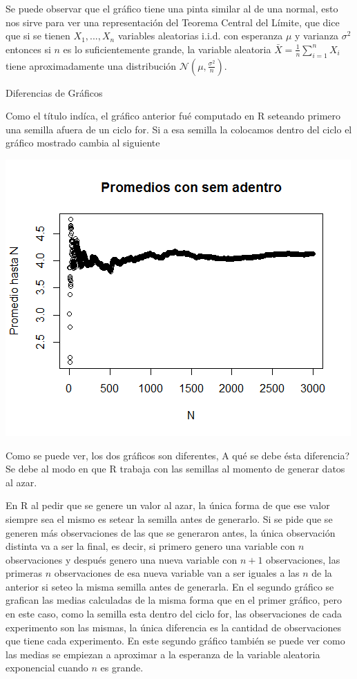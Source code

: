 \documentclass{article}
\begin{document}
	Se puede observar que el gr\'afico tiene una pinta similar al de una normal, esto nos sirve para ver una representaci\'on del Teorema Central del L\'imite, que dice que si se tienen $X_1,...,X_n$ variables aleatorias i.i.d. con esperanza $\mu$ y varianza $\sigma^2$ entonces si $n$ es lo suficientemente grande, la variable aleatoria $\bar{X} = \frac{1}{n}\sum_{i=1}^{n} X_i$ tiene aproximadamente una distribuci\'on $\mathcal{N}(\mu, \frac{\sigma^2}{n})$.
	\linebreak
	\linebreak
	\begin{flushleft}
		{\large Diferencias de Gr\'aficos}
		\linebreak
	\end{flushleft}
	Como el t\'itulo ind\'ica, el gr\'afico anterior fu\'e computado en R seteando primero una semilla afuera de un ciclo for. Si a esa semilla la colocamos dentro del ciclo el gr\'afico mostrado cambia al siguiente
	
	
	{\includegraphics[scale=0.75]{grafico2}
	\centering}
	
	Como se puede ver, los dos gr\'aficos son diferentes, \textquestiondown A qu\'e se debe \'esta diferencia? Se debe al modo en que R trabaja con las semillas al momento de generar datos al azar.
	
	En R al pedir que se genere un valor al azar, la \'unica forma de que ese valor siempre sea el mismo es setear la semilla antes de generarlo. Si se pide que se generen m\'as observaciones de las que se generaron antes, la \'unica observaci\'on distinta va a ser la final, es decir, si primero genero una variable con $n$ observaciones y despu\'es genero una nueva variable con $n+1$ observaciones, las primeras $n$ observaciones de esa nueva variable van a ser iguales a las $n$ de la anterior si seteo la misma semilla antes de generarla.
	En el segundo gr\'afico se grafican las medias calculadas de la misma forma que en el primer gr\'afico, pero en este caso, como la semilla esta dentro del ciclo for, las observaciones de cada experimento son las mismas, la \'unica diferencia es la cantidad de observaciones que tiene cada experimento.
	En este segundo gr\'afico tambi\'en se puede ver como las medias se empiezan a aproximar a la esperanza de la variable aleatoria exponencial cuando $n$ es grande.
	\newpage
	
\end{document}
